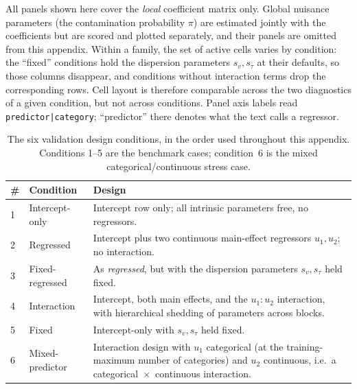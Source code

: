 All panels shown here cover the \emph{local} coefficient matrix only. Global
nuisance parameters (the contamination probability $\pi$) are estimated jointly
with the coefficients but are scored and plotted separately, and their panels
are omitted from this appendix. Within a family, the set of active cells varies
by condition: the ``fixed'' conditions hold the dispersion parameters
$s_v, s_\tau$ at their defaults, so those columns disappear, and conditions
without interaction terms drop the corresponding rows. Cell layout is therefore
comparable across the two diagnostics of a given condition, but not across
conditions. Panel axis labels read \texttt{predictor|category}; ``predictor''
there denotes what the text calls a regressor.

\begin{table}[htbp]
  \centering
  \small
  \begin{tabular}{@{}llp{7.6cm}@{}}
    \toprule
    \# & Condition & Design \\
    \midrule
    1 & Intercept-only    & Intercept row only; all intrinsic parameters free,
                            no regressors. \\
    2 & Regressed         & Intercept plus two continuous main-effect
                            regressors $u_1, u_2$; no interaction. \\
    3 & Fixed-regressed   & As \emph{regressed}, but with the dispersion
                            parameters $s_v, s_\tau$ held fixed. \\
    4 & Interaction       & Intercept, both main effects, and the
                            $u_1{:}u_2$ interaction, with hierarchical
                            shedding of parameters across blocks. \\
    5 & Fixed             & Intercept-only with $s_v, s_\tau$ held fixed. \\
    6 & Mixed-predictor   & Interaction design with $u_1$ categorical (at the
                            training-maximum number of categories) and $u_2$
                            continuous, i.e.\ a categorical~$\times$~continuous
                            interaction. \\
    \bottomrule
  \end{tabular}
  \caption{The six validation design conditions, in the order used throughout
    this appendix. Conditions 1--5 are the benchmark cases; condition~6 is the
    mixed categorical/continuous stress case.}
  \label{tab:e1-conditions}
\end{table}

